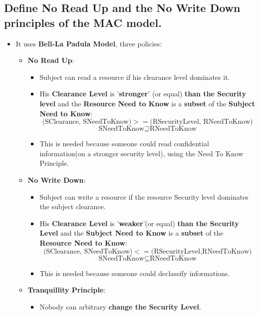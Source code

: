 \documentclass[9pt, letterpaper]{article}
\begin{document}
\subsection{Define No Read Up and the No Write Down principles of the MAC model.}
\begin{itemize}
	\item It uses \textbf{Bell-La Padula Model}, three policies:
	      \begin{itemize}
		      \item \textbf{No Read Up}:
		            \begin{itemize}
			            \item Subject can read a resource if his clearance level dominates it.
			            \item His \textbf{Clearance Level} is '\textbf{stronger}' (or equal) \textbf{than the Security level} and the \textbf{Resource Need to Know} is a \textbf{subset} of the \textbf{Subject Need to Know}:
			                  $$(\mbox{SClearance, SNeedToKnow)}>=(\mbox{RSecurityLevel, RNeedToKnow)}$$
			                  $$\mbox{SNeedToKnow} \supseteq \mbox{RNeedToKnow}$$
			            \item This is needed because someone could read confidential information(on a stronger security level), using the Need To Know Principle.
		            \end{itemize}
		      \item \textbf{No Write Down}:
		            \begin{itemize}
			            \item Subject can write a resource if the resource Security level dominates the subject clearance.
			            \item His \textbf{Clearance Level} is '\textbf{weaker}'(or equal) \textbf{than the Security Level} and the \textbf{Subject Need to Know} is a \textbf{subset} of the \textbf{Resource Need to Know}:
			                  $$(\mbox{SClearance, SNeedToKnow)} <= (\mbox{RSecurityLevel,RNeedToKnow)}$$
			                  $$\mbox{SNeedToKnow} \subseteq \mbox{RNeedToKnow}$$
			            \item This is needed because someone could declassify informations.
		            \end{itemize}
		      \item \textbf{Tranquillity Principle}:
		            \begin{itemize}
			            \item Nobody can arbitrary \textbf{change the Security Level}.
		            \end{itemize}
	      \end{itemize}
\end{itemize}
\end{document}
